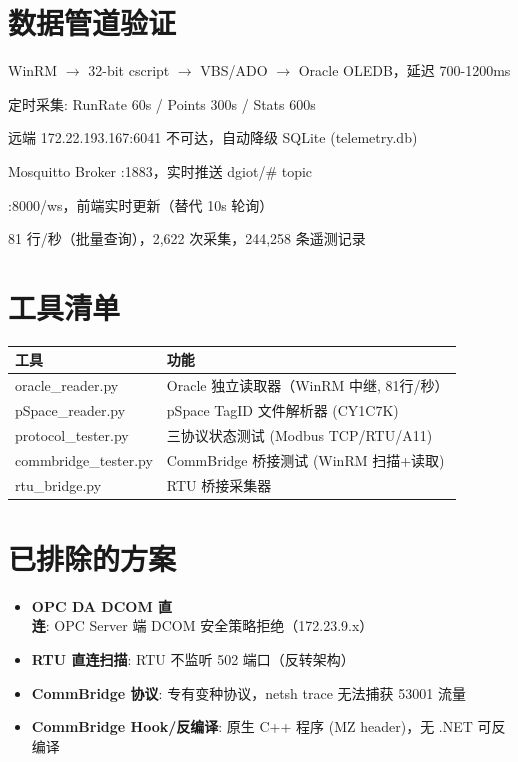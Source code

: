 \documentclass[12pt,a4paper]{ctexart}
\begin{document}
\section{数据管道验证}

\begin{description}[leftmargin=*]
  \item[Oracle Bridge] WinRM $\rightarrow$ 32-bit cscript $\rightarrow$ VBS/ADO $\rightarrow$ Oracle OLEDB，延迟 700-1200ms
  \item[Pipeline] 定时采集: RunRate 60s / Points 300s / Stats 600s
  \item[TDengine] 远端 172.22.193.167:6041 不可达，自动降级 SQLite (telemetry.db)
  \item[MQTT] Mosquitto Broker :1883，实时推送 dgiot/\# topic
  \item[WebSocket] :8000/ws，前端实时更新（替代 10s 轮询）
  \item[吞吐量] 81 行/秒（批量查询），2,622 次采集，244,258 条遥测记录
\end{description}

\section{工具清单}

\begin{table}[H]\centering
\begin{tabular}{p{5.5cm}p{7cm}}
\toprule
\textbf{工具} & \textbf{功能} \\
\midrule
oracle\_reader.py & Oracle 独立读取器（WinRM 中继, 81行/秒） \\
pSpace\_reader.py & pSpace TagID 文件解析器 (CY1C7K) \\
protocol\_tester.py & 三协议状态测试 (Modbus TCP/RTU/A11) \\
commbridge\_tester.py & CommBridge 桥接测试 (WinRM 扫描+读取) \\
rtu\_bridge.py & RTU 桥接采集器 \\
\bottomrule
\end{tabular}
\end{table}

\section{已排除的方案}

\begin{itemize}[leftmargin=*]
  \item \textbf{OPC DA DCOM 直连}: OPC Server 端 DCOM 安全策略拒绝（172.23.9.x）
  \item \textbf{RTU 直连扫描}: RTU 不监听 502 端口（反转架构）
  \item \textbf{CommBridge 协议}: 专有变种协议，netsh trace 无法捕获 53001 流量
  \item \textbf{CommBridge Hook/反编译}: 原生 C++ 程序 (MZ header)，无 .NET 可反编译
\end{itemize}
\end{document}
